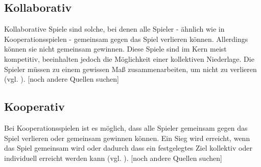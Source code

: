 \subsection{Kollaborativ}
Kollaborative Spiele sind solche, bei denen alle Spieler - ähnlich wie in Kooperationsspielen - gemeinsam gegen das Spiel verlieren können. Allerdings können sie nicht gemeinsam gewinnen. Diese Spiele sind im Kern meist kompetitiv, beeinhalten jedoch die Möglichkeit einer kollektiven Niederlage. Die Spieler müssen zu einem gewissen Maß zusammenarbeiten, um nicht zu verlieren (vgl. \cite{noauthor_game_2014}). [noch andere Quellen suchen]

\subsection{Kooperativ}
Bei Kooperationsspielen ist es möglich, dass alle Spieler gemeinsam gegen das Spiel verlieren oder gemeinsam gewinnen können. Ein Sieg wird erreicht, wenn das Spiel gemeinsam  wird oder dadurch dass ein festgelegtes Ziel kollektiv oder individuell erreicht werden kann (vgl. \cite{noauthor_game_2014}). [noch andere Quellen suchen]





